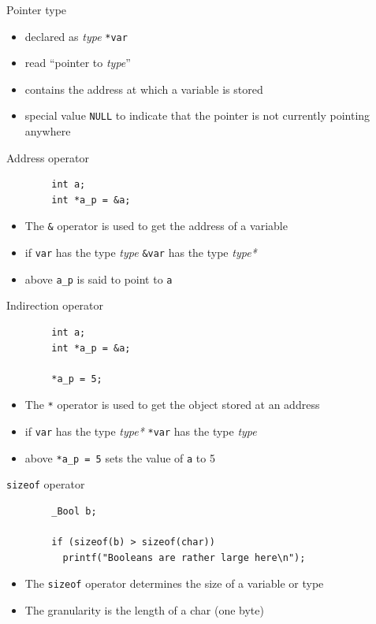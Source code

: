 \documentclass[english,compress]{beamer}
\begin{document}
\begin{frame}[fragile]{Pointer type}
	\begin{itemize}
		\item declared as {\it\color{blue}type} \lstinline|*var|
		\item read ``pointer to {\it\color{blue}type}''
		\item contains the address at which a variable is stored
		\item special value \lstinline|NULL| to indicate that
			the pointer is not currently pointing anywhere
	\end{itemize}
\end{frame}

\begin{frame}[fragile]{Address operator}
	\begin{lstlisting}
		int a;
		int *a_p = &a;
	\end{lstlisting}
	\begin{itemize}
		\item The \lstinline|&| operator is used to get the address of a variable
		\item if \lstinline|var| has the type {\it\color{blue}type}
			\lstinline|&var| has the type {\it\color{blue}type*}
		\item above \lstinline|a_p| is said to point to \lstinline|a|
	\end{itemize}
\end{frame}

\begin{frame}[fragile]{Indirection operator}
	\begin{lstlisting}
		int a;
		int *a_p = &a;

		*a_p = 5;
	\end{lstlisting}
	\begin{itemize}
		\item The \lstinline|*| operator is used to get the object stored at an address
		\item if \lstinline|var| has the type {\it\color{blue}type*}
			\lstinline|*var| has the type {\it\color{blue}type}
		\item above \lstinline|*a_p = 5| sets the value of \lstinline|a| to 5
	\end{itemize}
\end{frame}

\begin{frame}[fragile]{\lstinline|sizeof| operator}
	\begin{lstlisting}
		_Bool b;

		if (sizeof(b) > sizeof(char))
		  printf("Booleans are rather large here\n");
	\end{lstlisting}
	\begin{itemize}
		\item The \lstinline|sizeof| operator determines the size of a variable or type
		\item The granularity is the length of a char (one byte)
	\end{itemize}
\end{frame}
\end{document}
